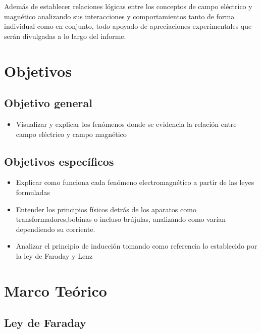 \documentclass[twocolumn, 12pt]{article}
\begin{document}
Además de establecer relaciones lógicas entre los conceptos de campo eléctrico 
y magnético analizando sus interacciones
y comportamientos tanto de forma individual como en
conjunto, todo apoyado de apreciaciones experimentales que
serán divulgadas a lo largo del informe.

\section{Objetivos}

\subsection*{Objetivo general}

\begin{itemize}[label=$\triangleright$]
	\item Visualizar y explicar los fenómenos donde se evidencia la
	      relación entre campo eléctrico y campo magnético
\end{itemize}

\subsection*{Objetivos específicos}

\begin{itemize}[label=$\triangleright$]
	\item Explicar como funciona cada fenómeno electromagnético a
	      partir de las leyes formuladas
	\item Entender los principios físicos detrás de los aparatos como
	      transformadores,bobinas o incluso brújulas, analizando como
	      varían dependiendo su corriente.
	\item Analizar el principio de inducción tomando como referencia
	      lo establecido por la ley de Faraday y Lenz
\end{itemize}

\section{Marco Teórico}

\subsection*{Ley de Faraday}
\end{document}
